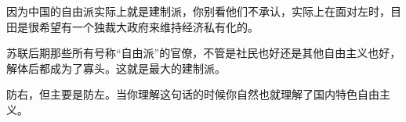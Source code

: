 \begin{zhihuanswer}
因为中国的自由派实际上就是建制派，你别看他们不承认，实际上在面对左时，目田是很希望有一个独裁大政府来维持经济私有化的。

苏联后期那些所有号称``自由派''的官僚，不管是社民也好还是其他自由主义也好，解体后都成为了寡头。这就是最大的建制派。

防右，但主要是防左。当你理解这句话的时候你自然也就理解了国内特色自由主义。
\end{zhihuanswer}

